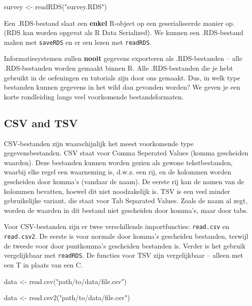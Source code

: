 \documentclass[]{tufte-book}
\newenvironment{Shaded}{}{}
\newcommand{\FunctionTok}[1]{\textcolor[rgb]{0.02,0.16,0.49}{#1}}
\newcommand{\NormalTok}[1]{#1}
\newcommand{\OtherTok}[1]{\textcolor[rgb]{0.00,0.44,0.13}{#1}}
\newcommand{\StringTok}[1]{\textcolor[rgb]{0.25,0.44,0.63}{#1}}
\begin{document}
\begin{Shaded}
\begin{Highlighting}[]
\NormalTok{survey }\OtherTok{\textless{}{-}} \FunctionTok{readRDS}\NormalTok{(}\StringTok{"survey.RDS"}\NormalTok{)}
\end{Highlighting}
\end{Shaded}

Een .RDS-bestand slaat een \textbf{enkel} R-object op een geserialiseerde manier op. (RDS kan worden opgevat als R Data Serialized). We kunnen een .RDS-bestand maken met \texttt{saveRDS} en er een lezen met \texttt{readRDS}.

Informatiesystemen zullen \textbf{nooit} gegevens exporteren als .RDS-bestanden -- alle .RDS-bestanden worden gemaakt binnen R. Alle .RDS-bestanden die je hebt gebruikt in de oefeningen en tutorials zijn door ons gemaakt. Dus, in welk type bestanden kunnen gegevens in het wild dan gevonden worden? We geven je een korte rondleiding langs veel voorkomende bestandsformaten.

\hypertarget{csv-and-tsv}{%
\subsection{CSV and TSV}\label{csv-and-tsv}}

CSV-bestanden zijn waarschijnlijk het meest voorkomende type gegevensbestanden. CSV staat voor Comma Seperated Values (komma gescheiden waarden). Deze bestanden kunnen worden gezien als gewone tekstbestanden, waarbij elke regel een waarneming is, d.w.z. een rij, en de kolommen worden gescheiden door komma's (vandaar de naam). De eerste rij kan de namen van de kolommen bevatten, hoewel dit niet noodzakelijk is. TSV is een veel minder gebruikelijke variant, die staat voor Tab Separated Values. Zoals de naam al zegt, worden de waarden in dit bestand niet gescheiden door komma's, maar door tabs.

Voor CSV-bestanden zijn er twee verschillende importfuncties: \texttt{read.csv} en \texttt{read.csv2}. De eerste is voor normale door komma's gescheiden bestanden, terwijl de tweede voor door puntkomma's gescheiden bestanden is. Verder is het gebruik vergelijkbaar met \texttt{readRDS}. De functies voor TSV zijn vergelijkbaar -- alleen met een T in plaats van een C.

\begin{Shaded}
\begin{Highlighting}[]
\NormalTok{data }\OtherTok{\textless{}{-}} \FunctionTok{read.csv}\NormalTok{(}\StringTok{"path/to/data/file.csv"}\NormalTok{)}

\NormalTok{data }\OtherTok{\textless{}{-}} \FunctionTok{read.csv2}\NormalTok{(}\StringTok{"path/to/data/file.csv"}\NormalTok{)}
\end{Highlighting}
\end{Shaded}
\end{document}
